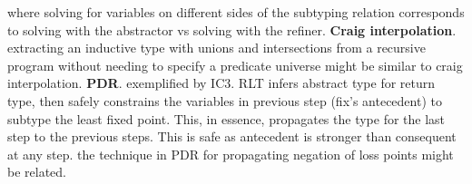\documentclass[letterpaper]{llncs}
\begin{document}
where solving for variables on different sides of the subtyping relation corresponds to
solving with the abstractor vs solving with the refiner.
\newline
\textbf{Craig interpolation}. extracting an inductive type with unions and intersections 
from a recursive program without needing to specify a predicate universe might be similar to
craig interpolation. \newline
\textbf{PDR}. exemplified by IC3. RLT infers abstract type for return type, 
then safely constrains the variables in previous step (fix's antecedent) 
to subtype the least fixed point.
This, in essence, propagates the type for the last step to the previous steps.
This is safe as antecedent is stronger than consequent at any step.
the technique in PDR for propagating negation of loss points might be related. 
 \newline 
\end{document}
